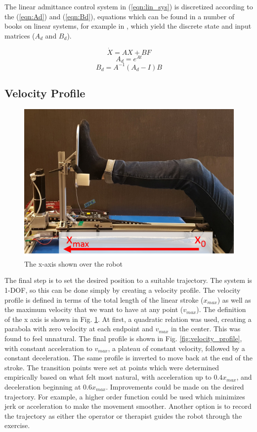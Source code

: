 \documentclass[12pt]{report}
\begin{document}
	The linear admittance control system in (\ref{eqn:lin_sys}) is discretized according to the (\ref{eqn:Ad}) and (\ref{eqn:Bd}), equations which can be found in a number of books on linear systems, for example in \cite{Evans2005}, which yield the discrete state and input matrices ($A_d$ and $B_d$).
	
	\begin{equation} \label{eqn:lin_sys} 
	\dot{X} = AX + BF
	\end{equation}
	\begin{equation} \label{eqn:Ad} 
	A_d = e^{At} 
	\end{equation}
	\begin{equation} \label{eqn:Bd} 
	B_d = A^{-1}(A_d - I)B
	\end{equation}
	
	\subsection{Velocity Profile}	
	
		\begin{figure}[h] 
		\centering
		\includegraphics[width=0.6\linewidth]{axis}
		\caption{The x-axis shown over the robot}
		\label{fig:axis}
	\end{figure}
	
	The final step is to set the desired position to a suitable trajectory. The system is 1-DOF, so this can be done simply by creating a velocity profile. The velocity profile is defined in terms of the total length of the linear stroke ($x_{max}$) as well as the maximum velocity that we want to have at any point ($v_{max}$). The definition of the x axis is shown in Fig. \ref{fig:axis}. At first, a quadratic relation was used, creating a parabola with zero velocity at each endpoint and $v_{max}$ in the center. This was found to feel unnatural. The final profile is shown in Fig. \ref{fig:velocity_profile}, with constant acceleration to $v_{max}$, a plateau of constant velocity, followed by a constant deceleration. The same profile is inverted to move back at the end of the stroke. The transition points were set at points which were determined empirically based on what felt most natural, with acceleration up to $0.4 x_{max}$, and deceleration beginning at $0.6 x_{max}$. 
	Improvements could be made on the desired trajectory. For example, a higher order function could be used which minimizes jerk or acceleration to make the movement smoother. Another option is to record the trajectory as either the operator or therapist guides the robot through the exercise.
	
\end{document}
